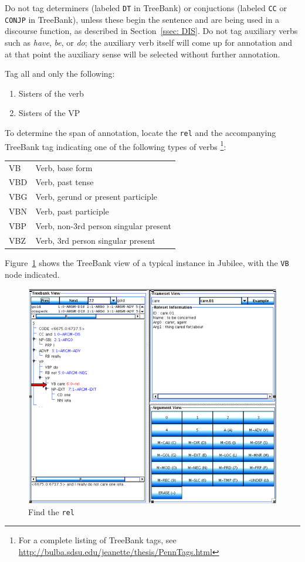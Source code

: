 \documentclass[11pt]{report}
\begin{document}
Do not tag determiners (labeled \texttt{DT} in TreeBank) or conjuctions (labeled \texttt{CC} or \texttt{CONJP} in TreeBank), unless these begin the sentence and are being used in a discourse function, as described in Section~\ref{ssec: DIS}.  Do not tag auxiliary verbs such as \textit{have}, \textit{be}, or \textit{do}; the auxiliary verb itself will come up for annotation and at that point the auxiliary sense will  be selected without further annotation. 

Tag all and only the following:
\begin{enumerate}
\item Sisters of the verb 
\item Sisters of the VP
\end{enumerate}

To determine the span of annotation, locate the \texttt{rel} and the accompanying TreeBank tag indicating one of the following types of verbs \footnote{For a complete listing of TreeBank tags, see \url{http://bulba.sdsu.edu/jeanette/thesis/PennTags.html}}: 

\begin{tabular}{ll}
	VB & Verb, base form \\
	VBD	& Verb, past tense \\
	VBG	& Verb, gerund or present participle \\
	VBN	& Verb, past participle \\
	VBP	& Verb, non-3rd person singular present \\
	VBZ	& Verb, 3rd person singular present
\end{tabular}

Figure~\ref{fig:VBArrow} shows the TreeBank view of a typical instance in Jubilee, with the \texttt{VB} node indicated. 

\begin{figure}[htbp]
\centering
\includegraphics[scale=0.4]{img/VBArrow.png}
\caption{Find the \texttt{rel}}
\label{fig:VBArrow}
\end{figure}
\end{document}

